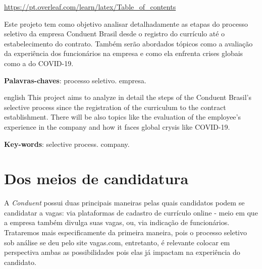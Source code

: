 \documentclass[12pt]{article}
\begin{document}
\url{ https://pt.overleaf.com/learn/latex/Table_of_contents}


\setlength{\absparsep}{18pt} %
\begin{resumo}

Este projeto tem como objetivo analisar detalhadamente as etapas do processo seletivo da empresa Conduent Brasil desde o registro do currículo até o estabelecimento do contrato. Também serão abordados tópicos como a avaliação da experiência dos funcionários na empresa e como ela enfrenta crises globais como a do COVID-19.    


\textbf
{Palavras-chaves}: processo seletivo. empresa.
\end{resumo}

\begin{resumo}[Abstract]
 \begin{otherlanguage*}{english}
  This project aims to analyze in detail the steps of the Conduent Brasil's selective process since the registration of the curriculum to the contract establishment. There will be also topics like the evaluation of the employee's experience in the company and how it faces global crysis like COVID-19.

   \vspace{\onelineskip}
 
   \noindent 
   \textbf{Key-words}: selective process. company.
 \end{otherlanguage*}
\end{resumo}



\maketitle


\section*{Dos meios de candidatura}

A \emph {Conduent} possui duas principais maneiras pelas quais candidatos podem se candidatar a vagas: via plataformas de cadastro de currículo online - meio em que a empresa também divulga suas vagas, ou, via indicação de funcionários. Trataremos mais especificamente da primeira maneira, pois o processo seletivo sob análise se deu pelo site vagas.com, entretanto, é relevante colocar em perspectiva ambas as possibilidades pois elas já impactam na experiência do candidato. 
\end{document}
